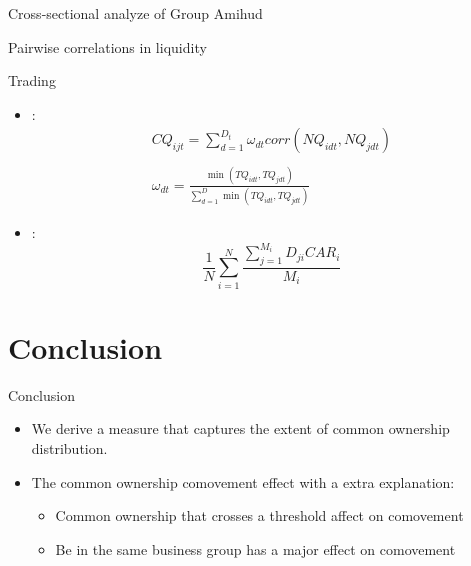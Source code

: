 \documentclass{beamer}
\begin{document}
\begin{frame}{Cross-sectional analyze of Group Amihud }
		\begin{table}[htbp]
		\centering
		\resizebox{0.95\textwidth}{!}{
			\centering
			
		}
		\label{Amihudcrosssection}
	\end{table}
	
\end{frame}


\begin{frame}{Pairwise correlations in liquidity }
	\begin{table}[htbp]
		\centering
		\resizebox{0.95\textwidth}{!}{
			\centering
			
		}
		\label{mresult2-liquidity}
	\end{table}
	
\end{frame}


	\begin{frame}{Trading}{}
		\begin{itemize}
			\item \cite{anton2018dealing}:
			\begin{equation*}
				\begin{array}{l}
					CQ_{ijt} = \sum_{d=1}^{D_t}\omega_{dt}corr(NQ_{idt},NQ_{jdt})
					\\\\
					\omega_{dt} = \frac{\min (TQ_{idt},TQ_{jdt})}{\sum_{d=1}^D \min(TQ_{idt},TQ_{jdt}) }
				\end{array}
			\end{equation*}
		\item \cite{ivashina2011institutional}:
		\begin{equation*}
			\frac{1}{N}\sum_{i = 1}^N\frac{\sum_{j = 1}^{M_i} D_{ji}CAR_i}{M_i}
		\end{equation*}
		\end{itemize}
	\end{frame}
	
	
	
	
	\section{Conclusion}
	
	\begin{frame}{Conclusion}
		\begin{itemize}
			
			\item We derive a measure that captures the extent of common ownership distribution.
			
			
			\item The common ownership comovement effect  with a
			extra explanation:
			\begin{itemize}
				\item Common ownership that  crosses a threshold affect on comovement
				\item Be in the same business group has a major effect on comovement
			\end{itemize} 
		\end{itemize}
	\end{frame}
	
\end{document}

